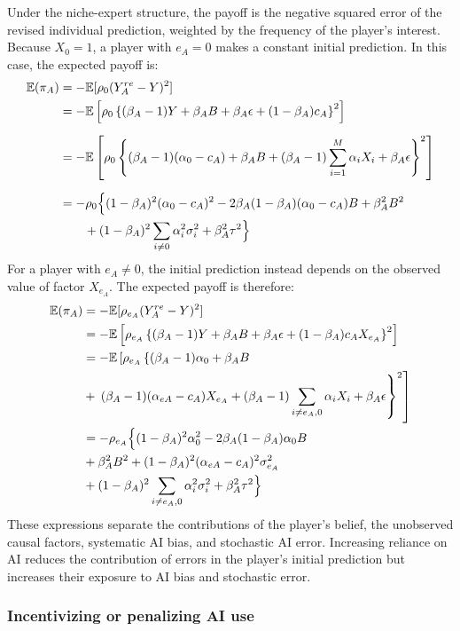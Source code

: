 \documentclass[12pt]{article}
\begin{document}
Under the niche-expert structure, the payoff is the negative squared error of the revised individual prediction, weighted by the frequency of the player's interest. 
Because $X_0=1$, a player with $e_A=0$ makes a constant initial prediction. 
In this case, the expected payoff is:
\begin{align}
\mathbb{E}(\pi_A)
&= -\mathbb{E}[\rho_{0}(Y_A^{re} - Y)^2] \\
&= -\mathbb{E}\left[\rho_{0}\left\{(\beta_A - 1)Y + \beta_A B + \beta_A \epsilon + (1-\beta_A)c_A \right\}^2\right] \\[6pt]
&= -\mathbb{E}\left[\rho_{0}\left\{(\beta_A - 1)(\alpha_0- c_A) + \beta_A B + (\beta_A - 1)\sum_{i=1}^{M} \alpha_i X_i + \beta_A \epsilon\right\}^2\right] \\[6pt]
&= -\rho_{0}\Bigl\{(1-\beta_A)^2(\alpha_0 - c_A)^2 - 2\beta_A(1-\beta_A)(\alpha_0 - c_A) B + \beta_A^2 B^2\\
&\qquad + (1-\beta_A)^2\sum_{i \neq 0}\alpha_i^2\sigma_i^2  + \beta_A^2\tau^2\Bigr\}
\end{align}
For a player with $e_A\neq0$, the initial prediction instead depends on the observed value of factor $X_{e_A}$. The expected payoff is therefore:
\begin{align}
\mathbb{E}(\pi_A)
&= -\mathbb{E}[\rho_{e_A}(Y_A^{re} - Y)^2] \\
&= -\mathbb{E}\left[\rho_{e_A}\left\{(\beta_A - 1)Y + \beta_A B + \beta_A \epsilon + (1-\beta_A)c_A X_{e_A} \right\}^2\right] \\
&= -\mathbb{E}\left[\rho_{e_A}\left\{(\beta_A -1 )\alpha_0 + \beta_A B  \right.\right. \\
&+ \left.\left. (\beta_A - 1)(\alpha_{eA} - c_A) X_{e_A} + (\beta_A - 1)\sum_{i \neq e_A, 0} \alpha_i X_i + \beta_A \epsilon\right\}^2\right] \\
&= -\rho_{e_A}\Bigl\{ (1-\beta_A)^2\alpha_0^2 - 2\beta_A(1-\beta_A)\alpha_0 B\\
&+ \beta_A^2 B^2  + (1-\beta_A)^2(\alpha_{eA} - c_A)^2\sigma_{e_A}^2 \\
&+ (1-\beta_A)^2\sum_{i \neq e_A, 0}\alpha_i^2\sigma_i^2 + \beta_A^2\tau^2\Bigr\}
\end{align}
These expressions separate the contributions of the player's belief, the unobserved causal factors, systematic AI bias, and stochastic AI error.
Increasing reliance on AI reduces the contribution of errors in the player's initial prediction but increases their exposure to AI bias and stochastic error.

\subsubsection*{Incentivizing or penalizing AI use}
\end{document}
